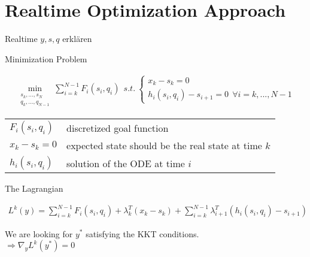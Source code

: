 \section{Realtime Optimization Approach}
\begin{frame}{Realtime}
$y, s, q$ erklären
\end{frame}

\begin{frame}{Minimization Problem}
\begin{block}{ }
\begin{align*}
  \min_{\begin{array}{c} s_{k},...,s_{N}\\ q_{k},...,q_{N-1} \end{array}} \sum_{i=k}^{N-1} F_{i}(s_{i},q_{i}) \ \  
  s.t. \ \left\lbrace \begin{array}{c}
  x_{k} - s_{k} = 0 \\
  h_i (s_i ,q_i ) - s_{i+1} = 0 \ \ \forall i = k, ... , N-1 \end{array} \right. 
\end{align*}
\end{block}
\begin{tabular}{l l}
  $F_i(s_i, q_i)$ &  discretized goal function \\
$x_k - s_k = 0$ & expected state should be the real state at time $k$ \\
$h_i (s_i ,q_i )$ & solution of the ODE at time $i$ \\
\end{tabular}
\end{frame}

\begin{frame}{The Lagrangian}
\begin{block}{ }
\begin{align*}
  L^{k}(y) = \sum_{i=k}^{N-1} F_{i}(s_{i},q_{i})
  + \lambda_{k}^{T}(x_{k} - s_{k})
  + \sum_{i=k}^{N-1} \lambda_{i+1}^{T} (h_i (s_i ,q_i ) - s_{i+1})
\end{align*}
\end{block}
\begin{center}
We are looking for $y^*$ satisfying the KKT conditions. \\

$\Rightarrow \nabla_{y} L^{k}(y^*)  = 0 $ 

\end{center}
\end{frame}

